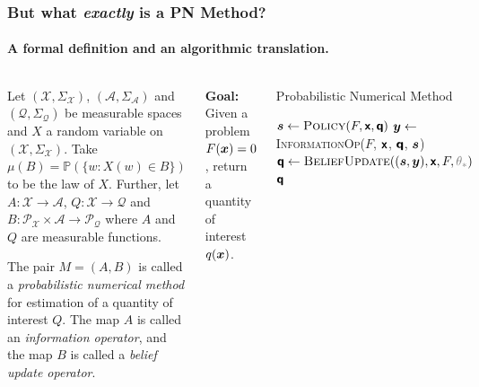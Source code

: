 \documentclass[10pt,usepdftitle=false,aspectratio=169]{beamer}
\begin{document}
\begin{frame}\frametitle{But what \textit{exactly} is a PN Method?}
	\framesubtitle{A formal definition and an algorithmic translation.}

	\begin{columns}[totalwidth=\textwidth]

		\begin{definition}
			Let \((\mathcal{X}, \Sigma_\mathcal{X})\),
			\((\mathcal{A}, \Sigma_\mathcal{A})\) and \((\mathcal{Q},
			\Sigma_\mathcal{Q})\) be measurable spaces and \(X\) a random variable on
			\((\mathcal{X}, \Sigma_\mathcal{X})\). Take
			\(\mu(B)=\mathbb{P}(\{w : X(w) \in B\})\) to be the law of \(X\). Further, let
			\(A:\mathcal{X} \rightarrow \mathcal{A}\), \(Q: \mathcal{X}
			\rightarrow \mathcal{Q}\) and \(B: \mathcal{P}_\mathcal{X} \times
			\mathcal{A} \rightarrow \mathcal{P}_\mathcal{Q}\) where \(A\) and
			\(Q\) are measurable functions.
			\vspace{1.5ex}

			The pair \(M=(A,B)\) is called a \emph{probabilistic numerical method} for estimation of a quantity of interest
			\(Q\). The map \(A\) is called an \emph{information operator}, and the map \(B\) is called a
			\emph{belief update operator}.
		\end{definition}



		\textbf{Goal:} Given a problem \(F({\bm{x}}) = 0\), return a quantity of interest \(q({\bm{x}})\).

		\setcounter{algorithm}{0}
		\begin{algorithm}[H]
			\caption{Probabilistic Numerical Method}
			\small
			\begin{algorithmic}[1]
				\State \({{\bm{s}}} \gets \textsc{Policy}(F, {\bm{\mathsf{x}}}, {\bm{\mathsf{q}}})\)
				\State \({{\bm{y}}} \gets\) \textsc{InformationOp}($F$, ${\bm{\mathsf{x}}}$, ${\bm{\mathsf{q}}}$, ${\bm{s}}$)
				\State \(\rvq \gets \textsc{BeliefUpdate}((\vs, \vy), \rvx, F,
				{\color{gray}\theta_*})\)
				\EndWhile
				\State \Return ${\bm{\mathsf{q}}}$
				\EndProcedure
			\end{algorithmic}
		\end{algorithm}

	\end{columns}

\end{frame}
\end{document}
